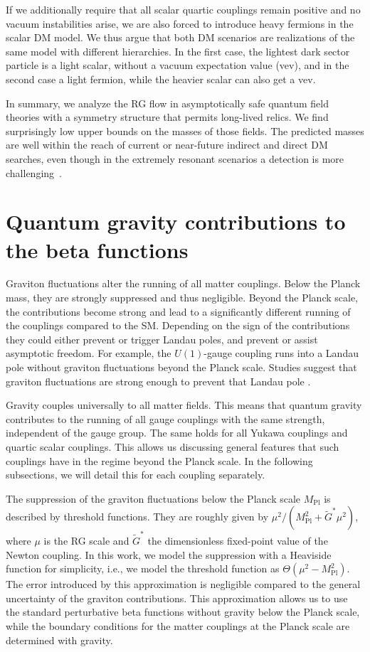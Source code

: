 \documentclass[aps,prd,twocolumn,preprintnumbers,superscriptaddress,nobibnotes,floatfix,longbibliography]{revtex4-1}
\begin{document}
If we additionally require that all scalar quartic couplings remain positive and no vacuum instabilities arise, we are also forced to introduce heavy fermions in the scalar DM model. We thus argue that both DM scenarios are realizations of the same model with different hierarchies. In the first case, the lightest dark sector particle is a light scalar, without a vacuum expectation value (vev), and in the second case a light fermion, while the heavier scalar can also get a vev. 

In summary, we analyze the RG flow in asymptotically safe quantum field theories with a symmetry structure that permits long-lived relics. We find surprisingly low upper bounds on the masses of those fields. 
The predicted masses are well within the reach of current or near-future indirect and direct DM searches, even though in the extremely resonant scenarios a detection is more challenging~\cite{1508.04418,1510.07562}.

\section{Quantum gravity contributions to the beta functions}
\label{sec:QG}
Graviton fluctuations alter the running of all matter couplings.
Below the Planck mass, they are strongly suppressed and thus negligible. 
Beyond the Planck scale, the contributions become strong and lead to a significantly different running of the couplings compared to the SM.
Depending on the sign of the contributions they could either prevent or trigger Landau poles, and prevent or assist asymptotic freedom.
For example, the $U(1)$-gauge coupling runs into a Landau pole without graviton fluctuations beyond the Planck scale.
Studies suggest that graviton fluctuations are strong enough to prevent that Landau pole \cite{1101.6007,1702.07724,1709.07252}. 

Gravity couples universally to all matter fields.
This means that quantum gravity contributes to the running of all gauge couplings with the same strength, independent of the gauge group.
The same holds for all Yukawa couplings and quartic scalar couplings.  
This allows us discussing general features that such couplings have in the regime beyond the Planck scale.
In the following subsections, we will detail this for each coupling separately.  

The suppression of the graviton fluctuations below the Planck scale $M_\text{Pl}$ is described by threshold functions.
They are roughly given by $\mu^2 /(M_\text{Pl}^2+ \tilde G^* \mu^2)$, where $\mu$ is the RG scale and $\tilde G^*$ the dimensionless fixed-point value of the Newton coupling.
In this work, we model the suppression with a Heaviside function for simplicity,
i.e., we model the threshold function as $\Theta(\mu^2-M_\text{Pl}^2)$.
The error introduced by this approximation is negligible compared to the general uncertainty of the graviton contributions.
This approximation allows us to use the standard perturbative beta functions without gravity below the Planck scale, 
while the boundary conditions for the matter couplings at the Planck scale are determined with gravity.
\end{document}
